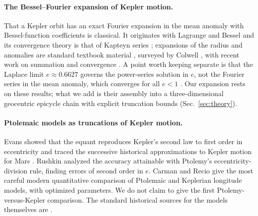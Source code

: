 \paragraph*{The Bessel--Fourier expansion of Kepler motion.}
That a Kepler orbit has an exact Fourier expansion in the mean anomaly with
Bessel-function coefficients is classical. It originates with Lagrange and
Bessel \cite{Dutka1995,Dutka1997} and its convergence theory is that of
Kapteyn series \cite{Kapteyn1893,Watson1944}; expansions of the radius and
anomalies are standard textbook material
\cite{BrouwerClemence1961,MurrayDermott1999}, surveyed by Colwell
\cite{Colwell1993}, with recent work on summation and convergence
\cite{Tautz2011,Borghi2024}. A point worth keeping separate is that the
Laplace limit $e\approx 0.6627$ governs the power-series solution in $e$, not
the Fourier series in the mean anomaly, which converges for all $e<1$
\cite{Dutka1997,Colwell1993}. Our expansion rests on these results;
what we add is their assembly into a three-dimensional geocentric epicycle
chain with explicit truncation bounds (Sec.~\ref{sec:theory}).

\paragraph*{Ptolemaic models as truncations of Kepler motion.}
Evans showed that the equant reproduces Kepler's second law to first order in
eccentricity \cite{Evans1984} and traced the successive historical
approximations to Kepler motion for Mars \cite{Evans1988}. Rushkin
\cite{Rushkin2015} analyzed the accuracy attainable with Ptolemy's
eccentricity-division rule, finding errors of second order in $e$. Carman and
Recio \cite{CarmanRecio2019} give the most careful modern quantitative
comparison of Ptolemaic and Keplerian longitude models, with optimized
parameters. We do not claim to give the first Ptolemy-versus-Kepler
comparison. The standard historical sources for the models themselves are
\cite{Toomer1998,Neugebauer1975,SwerdlowNeugebauer1984,Evans1998}.

